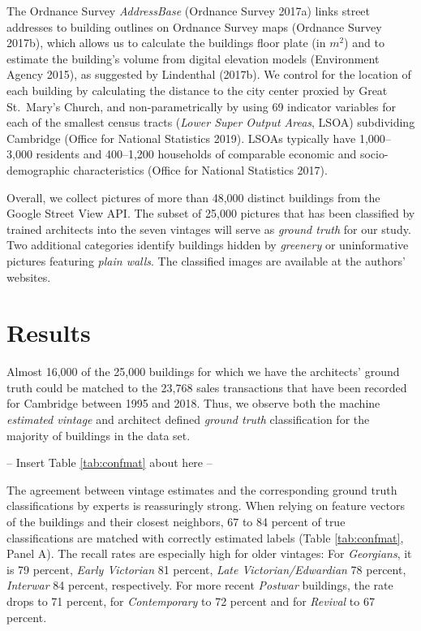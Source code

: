 \documentclass[]{article}
\begin{document}
The Ordnance Survey \emph{AddressBase} (Ordnance Survey 2017a) links
street addresses to building outlines on Ordnance Survey maps (Ordnance
Survey 2017b), which allows us to calculate the buildings floor plate
(in \(m^2\)) and to estimate the building's volume from digital
elevation models (Environment Agency 2015), as suggested by Lindenthal
(2017b). We control for the location of each building by calculating the
distance to the city center proxied by Great St.~Mary's Church, and
non-parametrically by using 69 indicator variables for each of the
smallest census tracts (\emph{Lower Super Output Areas}, LSOA)
subdividing Cambridge (Office for National Statistics 2019). LSOAs
typically have 1,000--3,000 residents and 400--1,200 households of
comparable economic and socio-demographic characteristics (Office for
National Statistics 2017).

Overall, we collect pictures of more than 48,000 distinct buildings from
the Google Street View API. The subset of 25,000 pictures that has been
classified by trained architects into the seven vintages will serve as
\emph{ground truth} for our study. Two additional categories identify
buildings hidden by \emph{greenery} or uninformative pictures featuring
\emph{plain walls}. The classified images are available at the authors'
websites.

\hypertarget{results}{%
\section{Results}\label{results}}

Almost 16,000 of the 25,000 buildings for which we have the architects'
ground truth could be matched to the 23,768 sales transactions that have
been recorded for Cambridge between 1995 and 2018. Thus, we observe both
the machine \emph{estimated vintage} and architect defined \emph{ground
truth} classification for the majority of buildings in the data set.

\begin{center}
  -- Insert Table \ref{tab:confmat} about here --
\end{center}

The agreement between vintage estimates and the corresponding ground
truth classifications by experts is reassuringly strong. When relying on
feature vectors of the buildings and their closest neighbors, 67 to 84
percent of true classifications are matched with correctly estimated
labels (Table \ref{tab:confmat}, Panel A). The recall rates are
especially high for older vintages: For \emph{Georgians}, it is 79
percent, \emph{Early Victorian} 81 percent, \emph{Late
Victorian/Edwardian} 78 percent, \emph{Interwar} 84 percent,
respectively. For more recent \emph{Postwar} buildings, the rate drops
to 71 percent, for \emph{Contemporary} to 72 percent and for
\emph{Revival} to 67 percent.
\end{document}
